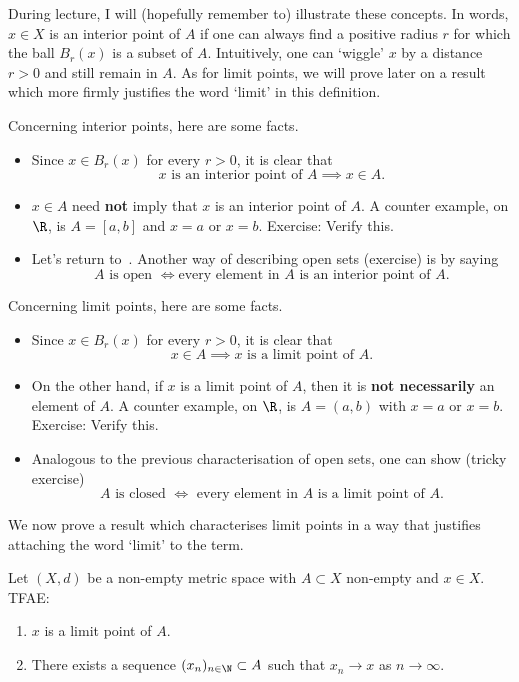 During lecture, I will (hopefully remember to) illustrate these concepts. In words, $x\in X$ is an interior point of $A$ if one can always find a positive radius $r$ for which the ball $B_r(x)$ is a subset of $A$. Intuitively, one can `wiggle' $x$ by a distance $r>0$ and still remain in $A$. As for limit points, we will prove later on a result which more firmly justifies the word `limit' in this definition.
\begin{rem}
	\label{rem:int_lim_pts}
	Concerning interior points, here are some facts.
	\begin{itemize}
		\item Since $x \in B_r(x)$ for every $r>0$, it is clear that
		\[
		x\text{ is an interior point of }A\implies x\in A.
		\]
		\item $x\in A$ need \textbf{not} imply that $x$ is an interior point of $A$. A counter example, on $\R$, is $A = [a,b]$ and $x = a$ or $x=b$. Exercise: Verify this.
		\item Let's return to~. Another way of describing open sets (exercise) is by saying
		\[
		A\text{ is open }\iff \text{every element in $A$ is an interior point of $A$}.
		\]
	\end{itemize}
	Concerning limit points, here are some facts.
	\begin{itemize}
		\item Since $x\in B_r(x)$ for every $r>0$, it is clear that
		\[
		x\in A \implies x\text{ is a limit point of $A$}.
		\]
		\item On the other hand, if $x$ is a limit point of $A$, then it is \textbf{not necessarily} an element of $A$. A counter example, on $\R$, is $A = (a,b)$ with $x = a$ or $x=b$. Exercise: Verify this.
		\item Analogous to the previous characterisation of open sets, one can show (tricky exercise)
		\[
		A\text{ is closed }\iff\text{ every element in $A$ is a limit point of $A$.}
		\]
	\end{itemize}
\end{rem}
We now prove a result which characterises limit points in a way that justifies attaching the word `limit' to the term.
\begin{lemma}
\label{lem:lim_pts}
Let $(X,d)$ be a non-empty metric space with $A\subset X$ non-empty and $x\in X$. TFAE:
\begin{enumerate}
	\item \label{lim_pts_1}$x$ is a limit point of $A$.
	\item \label{lim_pts_2}There exists a sequence $(x_n)_{n\in\N}\subset A$ such that $x_n \to x$ as $n\to \infty$.
\end{enumerate}
\end{lemma}
